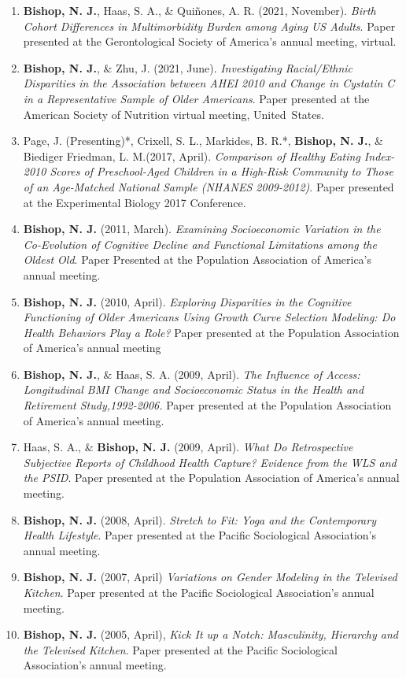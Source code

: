 \documentclass[
]{article}
\begin{document}
\begin{enumerate}
\def\labelenumi{\arabic{enumi}.}
\item
  \textbf{Bishop, N. J.}, Haas, S. A., \& Quiñones, A. R. (2021,
  November). \emph{Birth Cohort Differences in Multimorbidity Burden
  among Aging US Adults}. Paper presented at the Gerontological Society
  of America's annual meeting, virtual.
\item
  \textbf{Bishop, N. J.}, \& Zhu, J. (2021, June). \emph{Investigating
  Racial/Ethnic Disparities in the Association between AHEI 2010 and
  Change in Cystatin C in a Representative Sample of Older Americans}.
  Paper presented at the American Society of Nutrition virtual meeting,
  United~States.
\item
  Page, J. (Presenting)*, Crixell, S. L., Markides, B. R.*,
  \textbf{Bishop, N. J.}, \& Biediger Friedman, L. M.(2017, April).
  \emph{Comparison of Healthy Eating Index-2010 Scores of Preschool-Aged
  Children in a High-Risk Community to Those of an Age-Matched National
  Sample (NHANES 2009-2012)}. Paper presented at the Experimental
  Biology 2017 Conference.
\item
  \textbf{Bishop, N. J.} (2011, March). \emph{Examining Socioeconomic
  Variation in the Co-Evolution of Cognitive Decline and Functional
  Limitations among the Oldest Old}. Paper Presented at the Population
  Association of America's annual meeting.
\item
  \textbf{Bishop, N. J.} (2010, April). \emph{Exploring Disparities in
  the Cognitive Functioning of Older Americans Using Growth Curve
  Selection Modeling: Do Health Behaviors Play a Role?} Paper presented
  at the Population Association of America's annual meeting
\item
  \textbf{Bishop, N. J.}, \& Haas, S. A. (2009, April). \emph{The
  Influence of Access: Longitudinal BMI Change and Socioeconomic Status
  in the Health and Retirement Study,1992-2006.} Paper presented at the
  Population Association of America's annual meeting.
\item
  Haas, S. A., \& \textbf{Bishop, N. J.} (2009, April). \emph{What Do
  Retrospective Subjective Reports of Childhood Health Capture? Evidence
  from the WLS and the PSID}. Paper presented at the Population
  Association of America's annual meeting.
\item
  \textbf{Bishop, N. J.} (2008, April). \emph{Stretch to Fit: Yoga and
  the Contemporary Health Lifestyle}. Paper presented at the Pacific
  Sociological Association's annual meeting.
\item
  \textbf{Bishop, N. J.} (2007, April) \emph{Variations on Gender
  Modeling in the Televised Kitchen}. Paper presented at the Pacific
  Sociological Association's annual meeting.
\item
  \textbf{Bishop, N. J.} (2005, April), \emph{Kick It up a Notch:
  Masculinity, Hierarchy and the Televised Kitchen}. Paper presented at
  the Pacific Sociological Association's annual meeting.
\end{enumerate}
\end{document}
